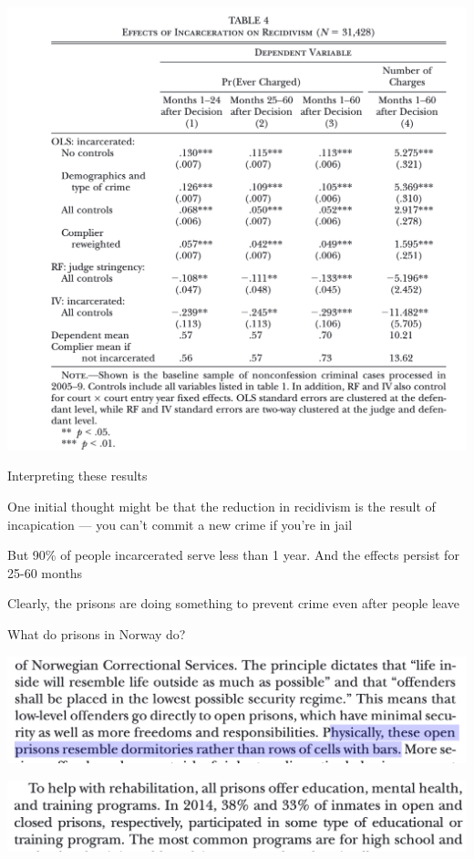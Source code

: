\documentclass[11pt,english,handout]{beamer}
\newenvironment{wideitemize}{\itemize\addtolength{\itemsep}{10pt}}{\enditemize}
\begin{document}
\begin{frame}
	\includegraphics[width = 0.9 \linewidth]{norway-iv}
\end{frame}

\begin{frame}{Interpreting these results}
	\pause
	\begin{wideitemize}
		\item
		One initial thought might be that the reduction in recidivism is the result of incapication --- you can't commit a new crime if you're in jail
		
		\pause
		\item
		But 90\% of people incarcerated serve less than 1 year. And the effects persist for 25-60 months
		
		\pause
		\item
		Clearly, the prisons are doing something to prevent crime even after people leave
	\end{wideitemize}
\end{frame}

\begin{frame}{What do prisons in Norway do?}
	\begin{center}
		\includegraphics[width = 0.9\linewidth]{description-prison} \pause \bigskip 
		
		
		\includegraphics[width = 0.9\linewidth]{description-prison-2}
	\end{center}
\end{frame}
\end{document}
